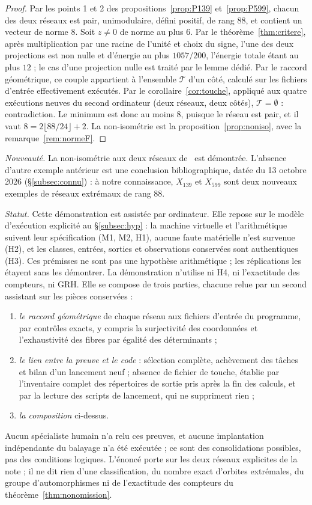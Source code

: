 \documentclass[11pt,a4paper]{amsart}
\theoremstyle{plain}
\theoremstyle{definition}
\numberwithin{equation}{section}
\newcommand{\Tc}{\mathcal{T}}
\begin{document}
\begin{proof}
Par les points 1 et 2 des propositions~\ref{prop:P139} et~\ref{prop:P599}, chacun des deux réseaux est pair, unimodulaire, défini positif, de rang $88$, et contient un vecteur de norme $8$. Soit $z\ne0$ de norme au plus $6$. Par le théorème~\ref{thm:critere}, après multiplication par une racine de l'unité et choix du signe, l'une des deux projections est non nulle et d'énergie au plus $1057/200$, l'énergie totale étant au plus $12$ ; le cas d'une projection nulle est traité par le lemme dédié. Par le raccord géométrique, ce couple appartient à l'ensemble $\Tc$ d'un côté, calculé sur les fichiers d'entrée effectivement exécutés. Par le corollaire~\ref{cor:touche}, appliqué aux quatre exécutions neuves du second ordinateur (deux réseaux, deux côtés), $\Tc=\emptyset$ : contradiction. Le minimum est donc au moins $8$, puisque le réseau est pair, et il vaut $8=2\lfloor88/24\rfloor+2$. La non-isométrie est la proposition~\ref{prop:noniso}, avec la remarque~\ref{rem:normeF}.
\end{proof}

\noindent\emph{Nouveauté.} La non-isométrie aux deux réseaux de~\cite{Sak26} est démontrée. L'absence d'autre exemple antérieur est une conclusion bibliographique, datée du 13 octobre 2026 (\S\ref{subsec:connu}) : à notre connaissance, $X_{139}$ et $X_{599}$ sont deux nouveaux exemples de réseaux extrémaux de rang $88$.

\noindent\emph{Statut.} Cette démonstration est assistée par ordinateur. Elle repose sur le modèle d'exécution explicité au \S\ref{subsec:hyp} : la machine virtuelle et l'arithmétique suivent leur spécification (M1, M2, H1), aucune faute matérielle n'est survenue (H2), et les classes, entrées, sorties et observations conservées sont authentiques (H3). Ces prémisses ne sont pas une hypothèse arithmétique ; les réplications les étayent sans les démontrer. La démonstration n'utilise ni H4, ni l'exactitude des compteurs, ni GRH. Elle se compose de trois parties, chacune relue par un second assistant sur les pièces conservées :
\begin{enumerate}[label=\textup{(\Alph*)}]
\item \emph{le raccord géométrique} de chaque réseau aux fichiers d'entrée du programme, par contrôles exacts, y compris la surjectivité des coordonnées et l'exhaustivité des fibres par égalité des déterminants ;
\item \emph{le lien entre la preuve et le code} : sélection complète, achèvement des tâches et bilan d'un lancement neuf ; absence de fichier de touche, établie par l'inventaire complet des répertoires de sortie pris après la fin des calculs, et par la lecture des scripts de lancement, qui ne suppriment rien ;
\item \emph{la composition} ci-dessus.
\end{enumerate}
Aucun spécialiste humain n'a relu ces preuves, et aucune implantation indépendante du balayage n'a été exécutée ; ce sont des consolidations possibles, pas des conditions logiques. L'énoncé porte sur les deux réseaux explicites de la note ; il ne dit rien d'une classification, du nombre exact d'orbites extrémales, du groupe d'automorphismes ni de l'exactitude des compteurs du théorème~\ref{thm:nonomission}.
\end{document}
